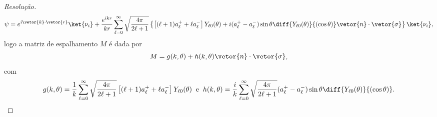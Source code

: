 \begin{proof}[Resolução]
   \begin{equation*}
      \psi = e^{i\vetor{k}\cdot\vetor{r}}\ket{\nu_i} + \frac{e^{ikr}}{kr} \sum_{\ell = 0}^\infty \sqrt{\frac{4\pi}{2\ell + 1}} \left\{\left[(\ell + 1)a_{\ell}^+ + \ell a_{\ell}^-\right]Y_{\ell 0}(\theta) + i(a_{\ell}^+ - a_{\ell}^-)\sin\theta \diff{Y_{\ell0}(\theta)}{(\cos\theta)} \vetor{n}\cdot\vetor{\sigma}\right\}\ket{\nu_i},
   \end{equation*}
   logo a matriz de espalhamento \(M\) é dada por
   \begin{equation*}
      M = g(k,\theta) + h(k,\theta)\vetor{n}\cdot\vetor{\sigma},
   \end{equation*}
   com
   \begin{equation*}
      g(k,\theta) = \frac{1}{k}\sum_{\ell = 0}^\infty \sqrt{\frac{4\pi}{2\ell + 1}} \left[(\ell + 1)a_{\ell}^+ + \ell a_{\ell}^-\right]Y_{\ell 0}(\theta)
      \;\;\text{e}\;\;
      h(k,\theta) = \frac{i}{k}\sum_{\ell = 0}^\infty \sqrt{\frac{4\pi}{2\ell + 1}} (a_{\ell}^+ - a_{\ell}^-)\sin\theta \diff{Y_{\ell0}(\theta)}{(\cos\theta)}.
   \end{equation*}


\end{proof}
